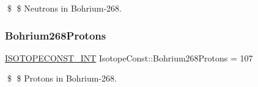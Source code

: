 \$ \$ Neutrons in Bohrium-\/268. \mbox{\label{group___isotope_const-_bohrium-_bh268_ga3b66ca99e9c875110b9afecc93286ae6}} 
\subsubsection{\texorpdfstring{Bohrium268\+Protons}{Bohrium268Protons}}
{\footnotesize\ttfamily \mbox{\hyperlink{group___isotope_const-_macros_ga5f18360b3e99483a35c32d789e62621c}{I\+S\+O\+T\+O\+P\+E\+C\+O\+N\+S\+T\+\_\+\+I\+NT}} Isotope\+Const\+::\+Bohrium268\+Protons = 107}

\$ \$ Protons in Bohrium-\/268. 